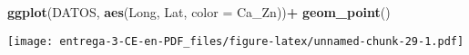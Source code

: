 \documentclass[
]{article}
\newenvironment{Shaded}{\begin{snugshade}}{\end{snugshade}}
\newcommand{\DataTypeTok}[1]{\textcolor[rgb]{0.13,0.29,0.53}{#1}}
\newcommand{\DecValTok}[1]{\textcolor[rgb]{0.00,0.00,0.81}{#1}}
\newcommand{\KeywordTok}[1]{\textcolor[rgb]{0.13,0.29,0.53}{\textbf{#1}}}
\newcommand{\NormalTok}[1]{#1}
\newcommand{\OperatorTok}[1]{\textcolor[rgb]{0.81,0.36,0.00}{\textbf{#1}}}
\newcommand{\StringTok}[1]{\textcolor[rgb]{0.31,0.60,0.02}{#1}}
\begin{document}
\begin{Shaded}
\begin{Highlighting}[]
\KeywordTok{ggplot}\NormalTok{(DATOS, }\KeywordTok{aes}\NormalTok{(Long, Lat, }\DataTypeTok{color =}\NormalTok{ Ca_Zn))}\OperatorTok{+}
\StringTok{  }\KeywordTok{geom_point}\NormalTok{()}
\end{Highlighting}
\end{Shaded}

\texttt{[image: entrega-3-CE-en-PDF\_files/figure-latex/unnamed-chunk-29-1.pdf]}

\begin{Shaded}
\end{Shaded}
\end{document}

